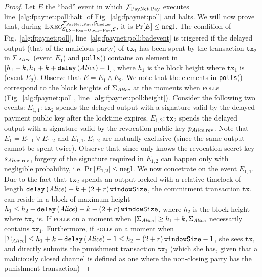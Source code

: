 \begin{proof}
  Let $E$ the ``bad'' event in which $\mathcal{F}_{\mathrm{PayNet}}{}_{\mathrm{, Pay}}$ executes
  line~\ref{alg:fpaynet:poll:halt} of Fig.~\ref{alg:fpaynet:poll} and halts. We
  will now prove that, during $\textsc{Exec}^{\mathcal{F}_{\mathrm{PayNet}}{}_{\mathrm{, Pay}},
  \mathcal{G}_{\mathrm{Ledger}}}_{\mathcal{S}_{\mathrm{LN - Reg - Open - Pay}}, \mathcal{E}}$, it is
  $\Pr[E] \leq \text{negl}$. The condition of Fig.~\ref{alg:fpaynet:poll},
  line~\ref{alg:fpaynet:poll:badevent} is triggered if the delayed output (that
  of the malicious party) of $\mathtt{tx}_1$ has been spent by the transaction
  $\mathtt{tx}_2$ in $\Sigma_{\mathit{Alice}}$ (event $E_1$) and \texttt{polls}(\alice)
  contains an element in $\left[h_1 + k, h_1 + k +
  \mathtt{delay}\left(\mathit{Alice}\right) - 1\right]$, where $h_1$ is the block height
  where $\mathtt{tx}_1$ is (event $E_2$). Observe that $E = E_1 \wedge E_2$. We
  note that the elements in \texttt{polls}(\alice) correspond to the block
  heights of $\Sigma_{\mathit{Alice}}$ at the moments when \alice{} \textsc{poll}s
  (Fig.~\ref{alg:fpaynet:poll}, line~\ref{alg:fpaynet:poll:height}). Consider
  the following two events: $E_{1,1}: \mathtt{tx}_2$ spends the delayed output
  with a signature valid by the delayed payment public key after the locktime
  expires. $E_{1,2}: \mathtt{tx}_2$ spends the delayed output with a signature
  valid by the revocation public key $p_{\mathit{Alice}, \mathrm{rev}}$. Note that $E_1
  = E_{1,1} \vee E_{1,2}$ and $E_{1,1}, E_{1,2}$ are mutually exclusive (since
  the same output cannot be spent twice). Observe that, since only \alice{}
  knows the revocation secret key $s_{\mathit{Alice}, \mathrm{rev}}$, forgery of the
  signature required in $E_{1,2}$ can happen only with negligible probability,
  i.e. $\Pr\left[E_{1,2}\right] \leq \text{negl}$. We now concetrate on the event
  $E_{1,1}$. Due to the fact that $\mathtt{tx}_2$ spends an output locked with a
  relative timelock of length $\mathtt{delay}\left(\mathit{Alice}\right) + k +
  \left(2 + r\right)\texttt{windowSize}$, the commitment transaction $\mathtt{tx}_1$ can reside in a block of
  maximum height $h_1 \leq h_2 - \mathtt{delay}\left(\mathit{Alice}\right) - k -
  \left(2 + r\right)\texttt{windowSize}$, where $h_2$ is the block height where $\mathtt{tx}_2$ is. If
  \alice{} \textsc{poll}s on a moment when $|\Sigma_{\mathit{Alice}}| \geq h_1 + k,
  \Sigma_{\mathit{Alice}}$ necessarily contains $\mathtt{tx}_1$. Furthermore, if
  \alice{} \textsc{poll}s on a moment when $|\Sigma_{\mathit{Alice}}| \leq h_1 + k +
  \mathtt{delay}\left(\mathit{Alice}\right) - 1 \leq h_2 - \left(2 + r\right)\texttt{windowSize}{} - 1$, she sees
  $\mathtt{tx}_1$ and directly submits the punishment transaction
  $\mathtt{tx}_3$ (which she has, given that a maliciously closed channel is
  defined as one where the non-closing party has the punishment transaction)

\end{proof}
